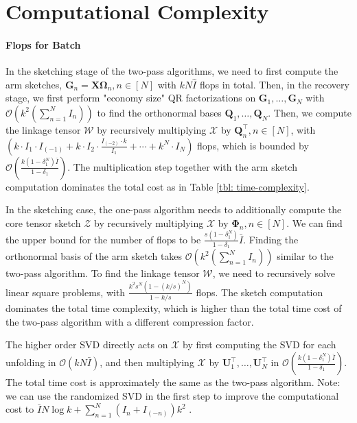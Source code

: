 \section{Computational Complexity} \label{appendix: time-complexity}

\paragraph{Flops for Batch}
In the sketching stage of the two-pass algorithms, we need to first compute the arm sketches, $\mathbf{G}_n = \mathbf{X}\mathbf{\Omega}_n, n \in [N]$ with $kN\hat{I}$ flops in total. Then, in the recovery stage, we first perform "economy size" QR factorizations on $\mathbf{G}_1, \dots, \mathbf{G}_N$ with $\mathscr{O}(k^2(\sum_{n =1}^N I_n))$ to find the orthonormal bases $\mathbf{Q}_1, \dots, \mathbf{Q}_N$. Then, we compute the linkage tensor $\mathscr{W}$ by recursively multiplying $\mathscr{X}$ by $\mathbf{Q}_n^\top, n \in [N]$, with $(k\cdot I_1 \cdot I_{(-1)} + k \cdot I_2 \cdot \frac{I_{(-2)}\cdot k}{I_1} + \cdots + k^{N}\cdot I_N)$ flops, which is bounded by $\mathcal{O}(\frac{k(1-\delta_1^N)\bar{I}}{1-\delta_1})$. The multiplication step together with the arm sketch computation dominates the total cost as in Table \ref{tbl: time-complexity}. 

In the sketching case, the one-pass algorithm needs to additionally compute the core tensor sketch $\mathscr{Z}$ by recursively multiplying $\mathscr{X}$ by $\mathbf{\Phi}_n, n \in [N]$. We can find the upper bound for the number of flops to be $\frac{s(1-\delta_1^N)}{1-\delta_1}\bar{I}$. Finding the orthonormal basis of the arm sketch takes $\mathscr{O}(k^2(\sum_{n =1}^N I_n))$ similar to the two-pass algorithm. To find the linkage tensor $\mathscr{W}$, we need to recursively solve linear square problems, with $\frac{k^2s^N(1-(k/s)^N)}{1-k/s}$ flops. The sketch computation dominates the total time complexity, which is higher than the total time cost of the two-pass algorithm with a different compression factor.

The higher order SVD directly acts on $\mathscr{X}$ by first computing the SVD for each unfolding in $\mathscr{O}(kN\bar{I})$, and then multiplying $\mathscr{X}$ by $\mathbf{U}_1^\top, \dots, \mathbf{U}_N^\top$ in $\mathcal{O}(\frac{k(1-\delta_1^N)\bar{I}}{1-\delta_1})$. The total time cost is approximately the same as the two-pass algorithm. Note: we can use the randomized SVD in the first step to improve the computational cost to $\bar{I}N\log k + \sum_{n = 1}^N(I_{n}+I_{(-n)})k^2$ \cite{halko2011finding}. 

